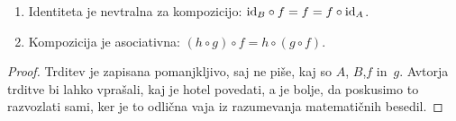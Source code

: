 \begin{trditev}
  \parbox{0pt}{}
  \begin{enumerate}
  \item Identiteta je nevtralna za kompozicijo: $\id[B] \circ f = f = f \circ \id[A]$.
  \item Kompozicija je asociativna: $(h \circ g) \circ f = h \circ (g \circ f)$.
  \end{enumerate}
\end{trditev}

\begin{proof}
  Trditev je zapisana pomanjkljivo, saj ne piše, kaj so $A$, $B$,$ f$ in~$g$. Avtorja
  trditve bi lahko vprašali, kaj je hotel povedati, a je bolje, da poskusimo to razvozlati
  sami, ker je to odlična vaja iz razumevanja matematičnih besedil.


\end{proof}
